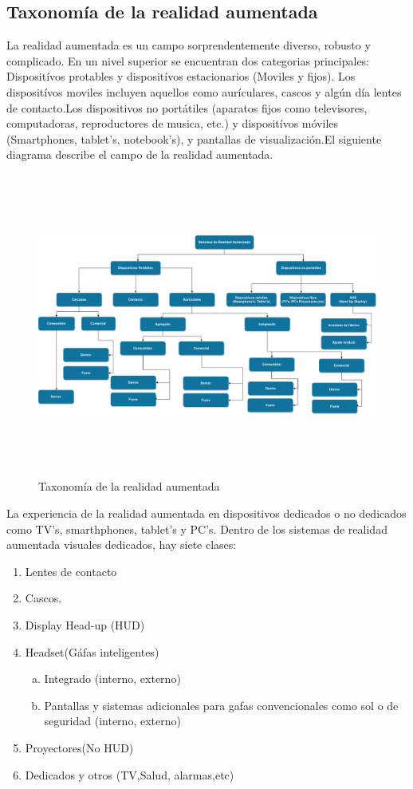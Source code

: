 \subsection{Taxonomía de la realidad aumentada}
La realidad aumentada es un campo sorprendentemente diverso, robusto y complicado. En un nivel superior se encuentran dos categorias principales: Dispositívos protables y dispositívos estacionarios (Moviles y fijos).
Los dispositívos moviles incluyen aquellos como aurículares, cascos y algún día lentes de contacto.Los dispositivos no portátiles (aparatos fijos como televisores, computadoras, reproductores de musica, etc.) y dispositívos móviles (Smartphones, tablet's, notebook's), y pantallas de visualización.El siguiente diagrama describe el campo de la realidad aumentada.\cite{B22} \par
\vspace{5mm}
\begin{figure}[h!]
	\centering
	\includegraphics[width=17cm,height=10cm]{imagenes/marcoteorico/ar/taxonomiaAR.png}
	\caption{Taxonomía de la realidad aumentada\cite{B22}}
	\label{fig:analogo}
\end{figure}
La experiencia de la realidad aumentada en dispositivos dedicados o no dedicados como TV's, smarthphones, tablet's y PC's. Dentro de los sistemas de realidad aumentada visuales dedicados, hay siete clases:\cite{B22} \par
\vspace{5mm}
\begin{enumerate}[1.]
	\item Lentes de contacto
	\item Cascos.
	\item Display Head-up (HUD)
	\item Headset(Gáfas inteligentes)
	\begin{enumerate}[a)]
		\item Integrado (interno, externo)
		\item Pantallas y sistemas adicionales para gafas convencionales como sol o de seguridad (interno, externo)
	\end{enumerate}
	\item Proyectores(No HUD)
	\item Dedicados y otros (TV,Salud, alarmas,etc)

\end{enumerate}

